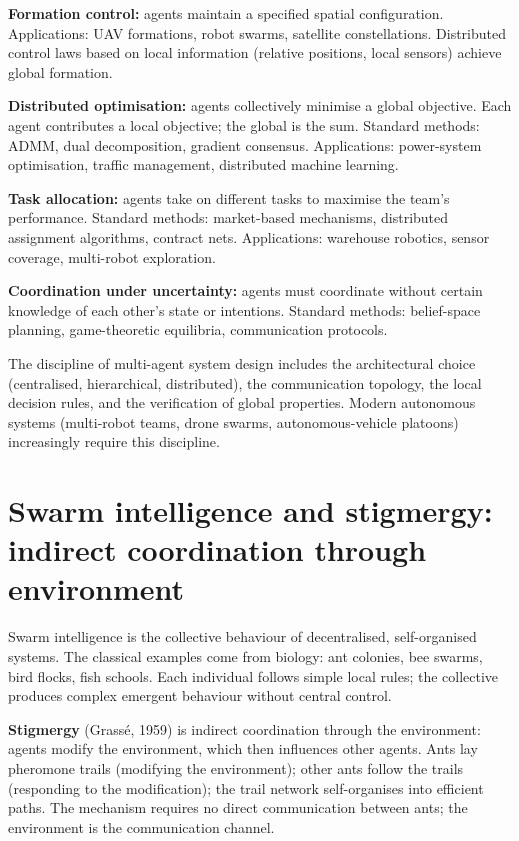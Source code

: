 \textbf{Formation control:} agents maintain a specified spatial configuration. Applications: UAV formations, robot swarms, satellite constellations. Distributed control laws based on local information (relative positions, local sensors) achieve global formation.

\textbf{Distributed optimisation:} agents collectively minimise a global objective. Each agent contributes a local objective; the global is the sum. Standard methods: ADMM, dual decomposition, gradient consensus. Applications: power-system optimisation, traffic management, distributed machine learning.

\textbf{Task allocation:} agents take on different tasks to maximise the team's performance. Standard methods: market-based mechanisms, distributed assignment algorithms, contract nets. Applications: warehouse robotics, sensor coverage, multi-robot exploration.

\textbf{Coordination under uncertainty:} agents must coordinate without certain knowledge of each other's state or intentions. Standard methods: belief-space planning, game-theoretic equilibria, communication protocols.

The discipline of multi-agent system design includes the architectural choice (centralised, hierarchical, distributed), the communication topology, the local decision rules, and the verification of global properties. Modern autonomous systems (multi-robot teams, drone swarms, autonomous-vehicle platoons) increasingly require this discipline.

\section{Swarm intelligence and stigmergy: indirect coordination through environment}

Swarm intelligence is the collective behaviour of decentralised, self-organised systems. The classical examples come from biology: ant colonies, bee swarms, bird flocks, fish schools. Each individual follows simple local rules; the collective produces complex emergent behaviour without central control.

\textbf{Stigmergy} (Grass\'e, 1959) is indirect coordination through the environment: agents modify the environment, which then influences other agents. Ants lay pheromone trails (modifying the environment); other ants follow the trails (responding to the modification); the trail network self-organises into efficient paths. The mechanism requires no direct communication between ants; the environment is the communication channel.

